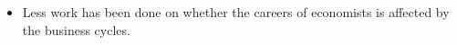 \documentclass[11pt]{beamer}
\begin{document}
\begin{frame}
\begin{itemize}
\vspace{1mm}
			\item Less work has been done on whether the careers of economists is affected by the business cycles.

		\end{itemize}
	\end{frame}
\end{document}

